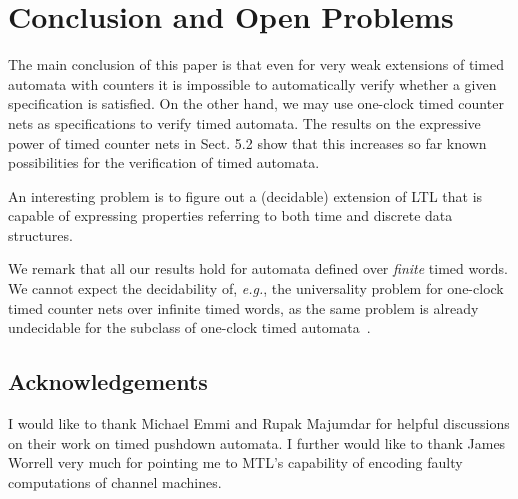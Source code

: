 \documentclass{CSML}
\theoremstyle{plain}\newtheorem{theorem}[thm]{Theorem}
\theoremstyle{plain}\newtheorem{corollary}[thm]{Corollary}
\theoremstyle{plain}\newtheorem{example}[thm]{Example}
\theoremstyle{plain}\newtheorem{lemma}[thm]{Lemma}
\theoremstyle{plain}\newtheorem{remark}[thm]{Remark}
\def\eg{{\em e.g.}}
\begin{document}
\section{Conclusion and Open Problems}
The main conclusion of this paper is that even for very weak extensions of timed automata with counters it is impossible to automatically verify whether a given specification is satisfied. 
On the other hand, we may use one-clock timed counter nets as specifications to verify timed automata.
The results on the expressive power of timed counter nets in Sect. 5.2 show that this increases so far known possibilities for the verification of timed automata. 

An interesting problem is to figure out a (decidable) extension of LTL that is capable of expressing properties referring to both time and discrete data structures. 

We remark that all our results hold for automata defined over \emph{finite} timed words. 
We cannot expect the decidability of, \eg, the universality problem for one-clock timed counter nets over infinite timed words, as the same problem is already undecidable for the subclass of one-clock timed automata~\cite{DBLP:journals/fuin/AbdullaDOQW08}. 



\subsection*{Acknowledgements}
I would like to thank Michael Emmi and Rupak Majumdar for helpful discussions on their work on timed pushdown automata. 
I further would like to thank James Worrell  very much for pointing me to MTL's capability of encoding faulty computations of channel machines.
\end{document}
